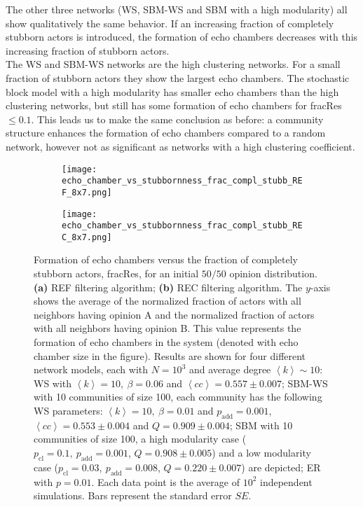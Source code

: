 \documentclass[11 pt , letterpaper , twoside , openright]{book}
\begin{document}
\newline
The other three networks (WS, SBM-WS and SBM with a high modularity) all show qualitatively the same behavior. If an increasing fraction of completely stubborn actors is introduced, the formation of echo chambers decreases with this increasing fraction of stubborn actors.\\
\newline
The WS and SBM-WS networks are the high clustering networks. For a small fraction of stubborn actors they show the largest echo chambers. The stochastic block model with a high modularity has smaller echo chambers than the high clustering networks, but still has some formation of echo chambers for fracRes $\leqslant 0.1$. This leads us to make the same conclusion as before: a community structure enhances the formation of echo chambers compared to a random network, however not as significant as networks with a high clustering coefficient.
\begin{figure}[H]
  \begin{subfigure}[t]{0.49\textwidth}
    \caption{}
  	\texttt{[image: echo\_chamber\_vs\_stubbornness\_frac\_compl\_stubb\_REF\_8x7.png]}
  \end{subfigure}
  \begin{subfigure}[t]{0.49\textwidth}
    \caption{}
  	\texttt{[image: echo\_chamber\_vs\_stubbornness\_frac\_compl\_stubb\_REC\_8x7.png]}
    \label{REC_frac_compl_stubb}
  \end{subfigure}
  \captionsetup{format=plain}
  \caption[Formation of echo chambers versus fraction of completely stubborn actors for the REF and REC filtering algorithms and an initial $50/50$ opinion distribution.]{Formation of echo chambers versus the fraction of completely stubborn actors, fracRes, for an initial $50/50$ opinion distribution. \textbf{(a)} REF filtering algorithm; \textbf{(b)} REC filtering algorithm. The $y$-axis shows the average of the normalized fraction of actors with all neighbors having opinion A and the normalized fraction of actors with all neighbors having opinion B. This value represents the formation of echo chambers in the system (denoted with echo chamber size in the figure). Results are shown for four different network models, each with $N=10^3$ and average degree $\left<k\right> \sim 10$: WS with $\left<k\right> =10,\ \beta = 0.06$ and $\left<cc \right> = 0.557 \pm 0.007$; SBM-WS with 10 communities of size 100, each community has the following WS parameters: $\left<k\right> = 10,\ \beta = 0.01$ and $p_{\text{add}} = 0.001$, $\left<cc\right> = 0.553 \pm 0.004$ and $Q = 0.909 \pm 0.004$; SBM with 10 communities of size 100, a high modularity case ($p_{\text{cl}} = 0.1,\ p_{\text{add}} = 0.001$, $Q = 0.908 \pm 0.005$) and a low modularity case ($p_{\text{cl}} = 0.03,\ p_{\text{add}} = 0.008$, $Q = 0.220 \pm 0.007$) are depicted; ER with $p= 0.01$. Each data point is the average of $10^2$ independent simulations. Bars represent the standard error $SE$.}
\label{echo_vs_frac_complStubb_REF-REC}
\end{figure}
\end{document}
